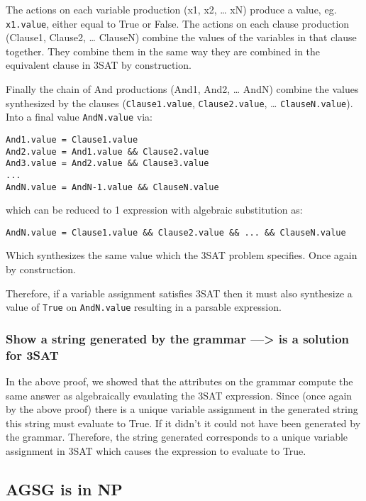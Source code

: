 The actions on each variable production (x1, x2, \ldots{} xN) produce a
value, eg. \verb!x1.value!, either equal to True or False. The actions
on each clause production (Clause1, Clause2, \ldots{} ClauseN) combine
the values of the variables in that clause together. They combine them
in the same way they are combined in the equivalent clause in 3SAT by
construction.

Finally the chain of And productions (And1, And2, \ldots{} AndN) combine
the values synthesized by the clauses (\verb!Clause1.value!,
\verb!Clause2.value!, \ldots{} \verb!ClauseN.value!). Into a final value
\verb!AndN.value! via:

\begin{verbatim}
And1.value = Clause1.value
And2.value = And1.value && Clause2.value
And3.value = And2.value && Clause3.value
...
AndN.value = AndN-1.value && ClauseN.value
\end{verbatim}
which can be reduced to 1 expression with algebraic substitution as:

\begin{verbatim}
AndN.value = Clause1.value && Clause2.value && ... && ClauseN.value
\end{verbatim}
Which synthesizes the same value which the 3SAT problem specifies. Once
again by construction.

Therefore, if a variable assignment satisfies 3SAT then it must also
synthesize a value of \verb!True! on \verb!AndN.value! resulting in a
parsable expression.

\subsubsection{Show a string generated by the grammar ---\textgreater{}
is a solution for 3SAT}

In the above proof, we showed that the attributes on the grammar compute
the same answer as algebraically evaulating the 3SAT expression. Since
(once again by the above proof) there is a unique variable assignment in
the generated string this string must evaluate to True. If it didn't it
could not have been generated by the grammar. Therefore, the string
generated corresponds to a unique variable assignment in 3SAT which
causes the expression to evaluate to True.

\subsection{AGSG is in NP}

